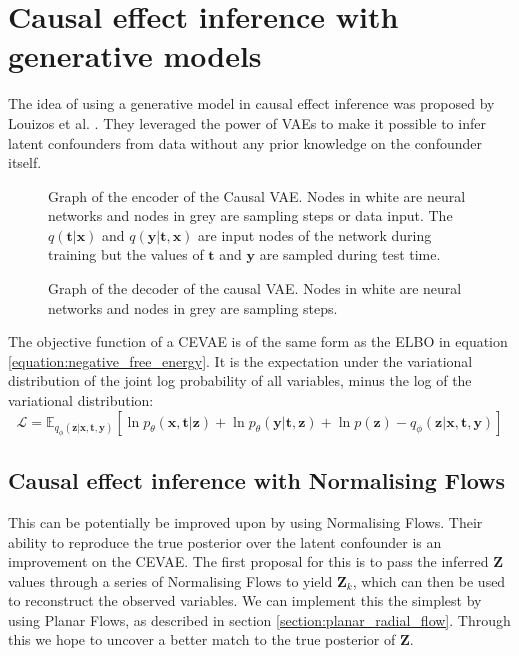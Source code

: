 \documentclass{report}
\newcommand{\E}{\mathbb{E}}
\newcommand{\bt}{\mathbf{t}}
\newcommand{\bx}{\mathbf{x}}
\newcommand{\by}{\mathbf{y}}
\newcommand{\bZ}{\mathbf{Z}}
\newcommand{\bz}{\mathbf{z}}
\begin{document}
\chapter{Causal effect inference with generative models}
The idea of using a generative model in causal effect inference was proposed by Louizos et al. \cite{louizos2017causal}. They leveraged the power of VAEs to make it possible to infer latent confounders from data without any prior knowledge on the confounder itself.

\begin{figure}
    \centering
    
    \caption{Graph of the encoder of the Causal VAE. Nodes in white are neural networks and nodes in grey are sampling steps or data input. The $q(\bt|\bx)$ and $q(\by|\bt, \bx)$ are input nodes of the network during training but the values of $\bt$ and $\by$ are sampled during test time.}
    \label{fig:cevae_encoder_graph}
\end{figure}
\begin{figure}
    \centering
    
    \caption{Graph of the decoder of the causal VAE. Nodes in white are neural networks and nodes in grey are sampling steps.} 
    \label{fig:cevae_decoder_graph}
\end{figure}

The objective function of a CEVAE is of the same form as the ELBO in equation  \ref{equation:negative_free_energy}. It is the expectation under the variational distribution of the joint log probability of all variables, minus the log of the variational distribution:
\begin{equation}
    \mathcal{L} = \E_{q_\phi(\bz|\bx, \bt, \by)}[\ln p_\theta(\bx, \bt | \bz) + \ln p_\theta(\by |\bt, \bz) +\ln p(\bz) - q_\phi(\bz | \bx, \bt, \by)]
\end{equation}

\section{Causal effect inference with Normalising Flows}
This can be potentially be improved upon by using Normalising Flows. Their ability to reproduce the true posterior over the latent confounder is an improvement on the CEVAE. The first proposal for this is to pass the inferred $\bZ$ values through a series of Normalising Flows to yield $\bZ_k$, which can then be used to reconstruct the observed variables. We can implement this the simplest by using Planar Flows, as described in section \ref{section:planar_radial_flow}. Through this we hope to uncover a better match to the true posterior of $\bZ$.
\end{document}

